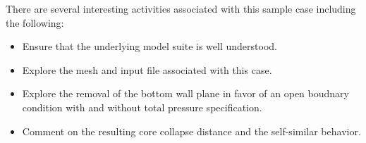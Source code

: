 \documentclass{article}
\begin{document}
There are several interesting activities associated with this sample case including
the following:

\begin{itemize}
	\item Ensure that the underlying model suite is well understood.
	\item Explore the mesh and input file associated with this case.
	\item Explore the removal of the bottom wall plane in favor of an open boudnary condition with 
          and without total pressure specification.
        \item Comment on the resulting core collapse distance and the self-similar behavior.
\end{itemize}
\end{document}
